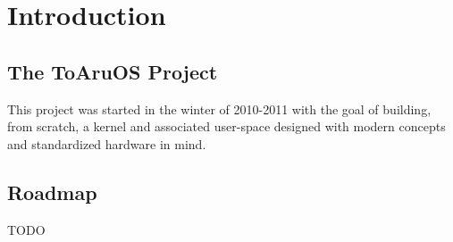 
\section{Introduction}

\subsection{The ToAruOS Project}

This project was started in the winter of 2010-2011 with the goal of building, from scratch, a kernel and associated user-space designed with modern concepts and standardized hardware in mind.

\subsection{Roadmap}

TODO
